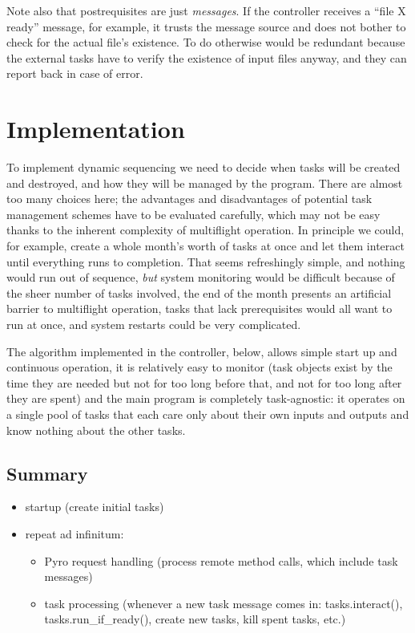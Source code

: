 \documentclass[a4paper,12pt]{amsart}
\begin{document}
Note also that postrequisites are just {\em messages}. If the controller
receives a ``file X ready'' message, for example, it trusts the message
source and does not bother to check for the actual file's existence. To
do otherwise would be redundant because the external tasks have to
verify the existence of input files anyway, and they can report back in
case of error.


\section{Implementation}

To implement dynamic sequencing we need to decide when tasks will be
created and destroyed, and how they will be managed by the program.
There are almost too many choices here; the advantages and disadvantages
of potential task management schemes have to be evaluated carefully,
which may not be easy thanks to the inherent complexity of multiflight
operation. In principle we could, for example, create a whole month's
worth of tasks at once and let them interact until everything runs to
completion. That seems refreshingly simple, and nothing would run out of
sequence, {\em but} system monitoring would be difficult because of the
sheer number of tasks involved, the end of the month presents an
artificial barrier to multiflight operation, tasks that lack
prerequisites would all want to run at once, and system restarts could
be very complicated. 

The algorithm implemented in the controller, below, allows simple start
up and continuous operation, it is relatively easy to monitor (task
objects exist by the time they are needed but not for too long before
that, and not for too long after they are spent) and the main program is
completely task-agnostic: it operates on a single pool of tasks that
each care only about their own inputs and outputs and know nothing about
the other tasks.  

\subsection{Summary}

\begin{itemize}
    \item startup (create initial tasks)
    \item repeat ad infinitum:
    \begin{itemize}
        \item Pyro request handling (process remote method calls, which
        include task messages)
        \item task processing (whenever a new task message comes in:
        tasks.interact(), tasks.run\_if\_ready(), create new tasks, kill
        spent tasks, etc.)
    \end{itemize}
\end{itemize}
\end{document}
